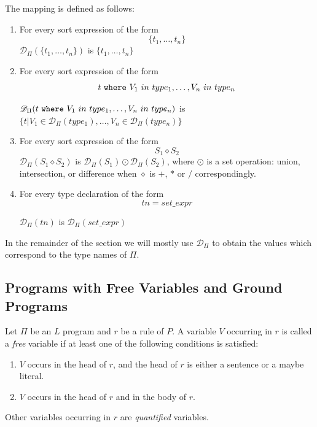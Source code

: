 \documentclass[a4paper,10pt]{article}
\begin{document}
\medskip\noindent 
The mapping is defined as follows:

\begin{enumerate}
\item For every sort expression of the form $$\{t_1,\ldots,t_n\}$$   $\mathcal{D}_\Pi(\{t_1,\ldots,t_n\})$ is $ \{t_1,\ldots,t_n\}$
\item For every sort expression of the form   $$t~\mbox{\texttt{where}} ~V_1~in~type_1,\ldots, V_n~in~type_n$$
 
\noindent
$\mathcal{D}_\Pi(t~\mbox{\texttt{where}} ~V_1~in~type_1,\ldots, V_n~in~type_n)$ is $\{t| V_1 \in \mathcal{D}_\Pi(type_1),\ldots, V_n \in \mathcal{D}_\Pi(type_n)\}$ 
\item For every sort expression of the form $$S_1 \diamond S_2$$ 
$\mathcal{D}_\Pi(S_1 \diamond S_2)$ is $ \mathcal{D}_\Pi(S_1) \odot  \mathcal{D}_\Pi(S_2)$, where $\odot$ is a set operation: union, intersection, or difference when $\diamond$ is $+$, $*$ or $/$ correspondingly.

\item For every type declaration of the form $$tn = set\_expr$$

$\mathcal{D}_\Pi(tn)$ is $\mathcal{D}_\Pi(set\_expr)$  


\end{enumerate}

\medskip\noindent
In the remainder of the section  we will mostly  use   $\mathcal{D}_\Pi$ to obtain the values  which correspond to the type names of $\Pi$.



\subsection{Programs with Free Variables and Ground Programs}\label{grp}

Let $\Pi$ be an $L$ program and $r$ be a rule of $P$. 
A variable $V$ occurring in  $r$  is called a \textit{free} variable if at least one of the following conditions is satisfied:
\begin{enumerate}
\item $V$ occurs in the  head of $r$, and the head of $r$ is either a sentence or a maybe literal.
\item $V$ occurs in the head of $r$ and in the body of $r$.
\end{enumerate}
Other variables occurring in $r$ are \textit{quantified} variables.
\end{document}
